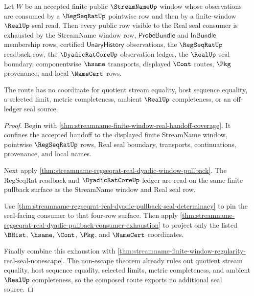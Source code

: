 \begin{theorem}
\label{thm:streamname-finite-window-real-seal-route-exhaustion}
Let $W$ be an accepted finite public $\StreamNameUp$ window whose observations are consumed by a $\RegSeqRatUp$ pointwise row and then by a finite-window $\RealUp$ seal read. Then every public row visible to the Real seal consumer is exhausted by the StreamName window row, $\mathsf{ProbeBundle}$ and $\mathsf{InBundle}$ membership rows, certified $\mathsf{UnaryHistory}$ observations, the $\RegSeqRatUp$ readback row, the $\DyadicRatCoreUp$ observation ledger, the $\RealUp$ seal boundary, componentwise $\hsame$ transports, displayed $\Cont$ routes, $\Pkg$ provenance, and local $\NameCert$ rows.

The route has no coordinate for quotient stream equality, host sequence equality, a selected limit, metric completeness, ambient $\RealUp$ completeness, or an off-ledger seal source.
\end{theorem}
\begin{proof}
Begin with \autoref{thm:streamname-finite-window-real-handoff-coverage}. It confines the accepted handoff to the displayed finite StreamName window, pointwise $\RegSeqRatUp$ rows, Real seal boundary, transports, continuations, provenance, and local names.

Next apply \autoref{thm:streamname-regseqrat-real-dyadic-window-pullback}. The RegSeqRat readback and $\DyadicRatCoreUp$ ledger are read on the same finite pullback surface as the StreamName window and Real seal row.

Use \autoref{thm:streamname-regseqrat-real-dyadic-pullback-seal-determinacy} to pin the seal-facing consumer to that four-row surface. Then apply \autoref{thm:streamname-regseqrat-real-dyadic-pullback-consumer-exhaustion} to project only the listed $\BHist$, $\hsame$, $\Cont$, $\Pkg$, and $\NameCert$ coordinates.

Finally combine this exhaustion with \autoref{thm:streamname-finite-window-regularity-real-seal-nonescape}. The non-escape theorem already rules out quotient stream equality, host sequence equality, selected limits, metric completeness, and ambient $\RealUp$ completeness, so the composed route exports no additional seal source.
\end{proof}

